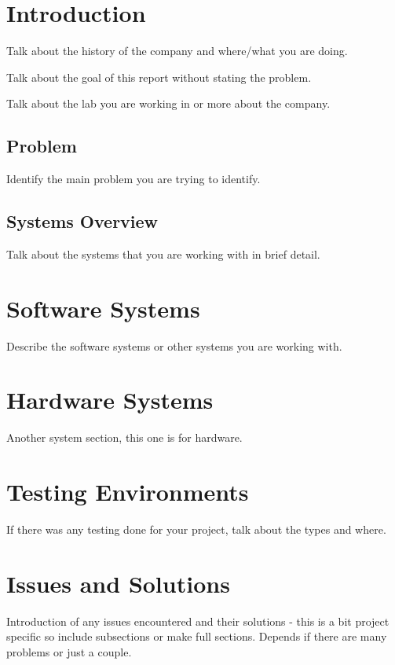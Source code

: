 \section{Introduction}
Talk about the history of the company and where/what you are doing.

Talk about the goal of this report without stating the problem.

Talk about the lab you are working in or more about the company.
\subsection{Problem}
Identify the main problem you are trying to identify.

\subsection{Systems Overview}
Talk about the systems that you are working with in brief detail.
\newpage


\section{Software Systems}
Describe the software systems or other systems you are working with.


\section{Hardware Systems}
Another system section, this one is for hardware.



\section{Testing Environments}
If there was any testing done for your project, talk about the types and where.



\section{Issues and Solutions}
Introduction of any issues encountered and their solutions - this is a bit project specific so include subsections or make full sections.  Depends if there are many problems or just a couple.

